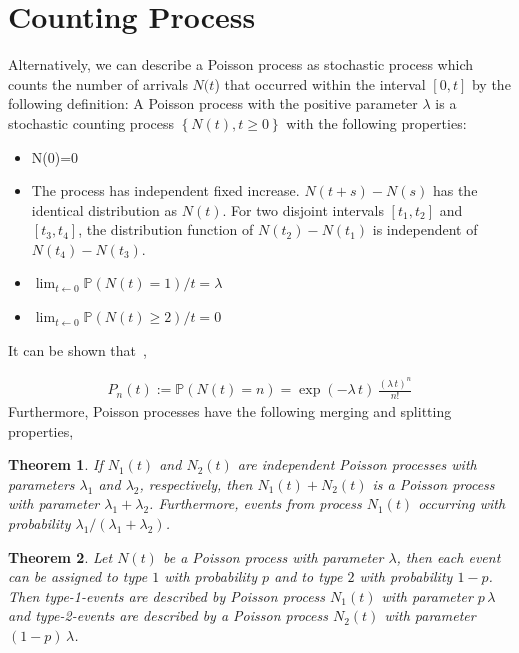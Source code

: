 \documentclass[11pt, a4paper]{thesis}  %
\newtheorem{theorem}{Theorem}
\begin{document}
\section{Counting Process}
\label{section:poisson:counting_process}

Alternatively, we can describe a Poisson process as stochastic process which counts the number of arrivals $N(t$) that occurred within the interval $[0,t]$ by the following definition: A Poisson process with the positive parameter $\lambda$ is a stochastic counting process 
$\left\lbrace N(t), t \ge 0\right\rbrace$ with the following properties: 
%
\begin{itemize}
	\item N(0)=0
	
	\item The process has independent fixed increase. 
	$N(t+s)-N(s)$ has the identical distribution as $N(t)$. For two disjoint intervals $[t_1,t_2]$ 
	and $[t_3,t_4]$, the distribution function of $N(t_2)-N(t_1)$ is independent of  $N(t_4)-N(t_3)$.
	
	\item $\lim_{t \leftarrow 0} \mathbb{P}\left(N(t) = 1\right)/t = \lambda$
	
	\item $\lim_{t \leftarrow 0} \mathbb{P}\left(N(t) \ge 2\right)/t = 0$
\end{itemize}
% 
It can be shown that~\cite{Gallager:2013:stochastic_processes},

\begin{eqnarray}
	P_n(t):=\mathbb{P}(N(t)=n)=\exp(-\lambda\,t)\,\frac{(\lambda\,t)^n}{n!}
\end{eqnarray}
%
Furthermore, Poisson processes have the following merging and splitting properties,

\begin{theorem}
If $N_1(t)$ and $N_2(t)$ are independent Poisson processes with parameters $\lambda_1$ and $\lambda_2$, respectively, then $N_1(t)+N_2(t)$ is a Poisson process with parameter $\lambda_1+\lambda_2$. Furthermore, events from process $N_1(t)$ occurring with probability $\lambda_1/(\lambda_1 +  \lambda_2)$.
\label{theorem:poisson_merging}
\end{theorem}

\begin{theorem}
Let $N(t)$ be a Poisson process with parameter $\lambda$, then each event can be assigned to type $1$ with probability $p$ and to type $2$ with probability $1-p$. Then type-1-events are described by Poisson process $N_1(t)$ with parameter $p\,\lambda$ and type-2-events are described by a Poisson process $N_2(t)$ with parameter $(1-p)\,\lambda$.
\label{theorem:poisson_splitting}
\end{theorem}
\end{document}
